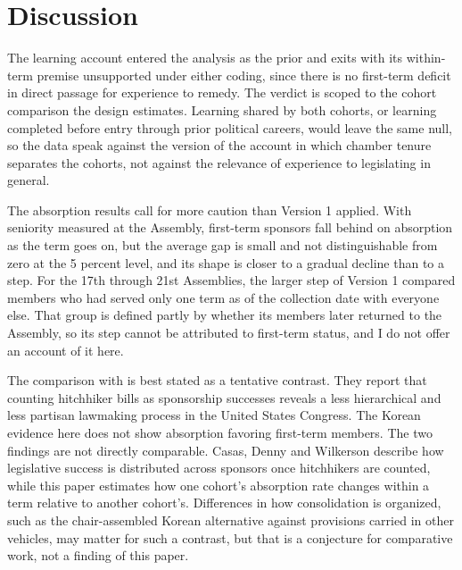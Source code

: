 \documentclass[11pt]{article}
\begin{document}
\section{Discussion}

The learning account entered the analysis as the prior and exits with its within-term premise unsupported under either coding, since there is no first-term deficit in direct passage for experience to remedy. The verdict is scoped to the cohort comparison the design estimates. Learning shared by both cohorts, or learning completed before entry through prior political careers, would leave the same null, so the data speak against the version of the account in which chamber tenure separates the cohorts, not against the relevance of experience to legislating in general.

The absorption results call for more caution than Version 1 applied. With seniority measured at the Assembly, first-term sponsors fall behind on absorption as the term goes on, but the average gap is small and not distinguishable from zero at the 5 percent level, and its shape is closer to a gradual decline than to a step. For the 17th through 21st Assemblies, the larger step of Version 1 compared members who had served only one term as of the collection date with everyone else. That group is defined partly by whether its members later returned to the Assembly, so its step cannot be attributed to first-term status, and I do not offer an account of it here.

The comparison with \citet{casas2020} is best stated as a tentative contrast. They report that counting hitchhiker bills as sponsorship successes reveals a less hierarchical and less partisan lawmaking process in the United States Congress. The Korean evidence here does not show absorption favoring first-term members. The two findings are not directly comparable. Casas, Denny and Wilkerson describe how legislative success is distributed across sponsors once hitchhikers are counted, while this paper estimates how one cohort's absorption rate changes within a term relative to another cohort's. Differences in how consolidation is organized, such as the chair-assembled Korean alternative against provisions carried in other vehicles, may matter for such a contrast, but that is a conjecture for comparative work, not a finding of this paper.
\end{document}
